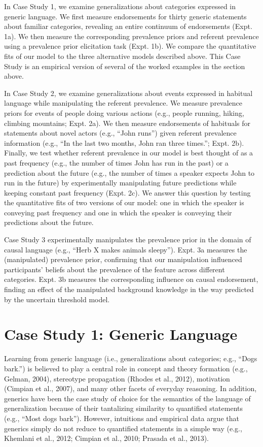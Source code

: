 \documentclass[english,,man,floatsintext]{apa6}
\theoremstyle{definition}
\theoremstyle{definition}
\theoremstyle{definition}
\theoremstyle{remark}
\begin{document}
In Case Study 1, we examine generalizations about categories expressed
in generic language. We first measure endorsements for thirty generic
statements about familiar categories, revealing an entire continuum of
endorsements (Expt. 1a). We then measure the corresponding prevalence
priors and referent prevalence using a prevalence prior elicitation task
(Expt. 1b). We compare the quantitative fits of our model to the three
alternative models described above. This Case Study is an empirical
version of several of the worked examples in the section above.

In Case Study 2, we examine generalizations about events expressed in
habitual language while manipulating the referent prevalence. We measure
prevalence priors for events of people doing various actions (e.g.,
people running, hiking, climbing mountains; Expt. 2a). We then measure
endorsements of habituals for statements about novel actors (e.g.,
\enquote{John runs}) given referent prevalence information (e.g.,
\enquote{In the last two months, John ran three times.}; Expt. 2b).
Finally, we test whether referent prevalence in our model is best
thought of as a past frequency (e.g., the number of times John has run
in the past) or a prediction about the future (e.g., the number of times
a speaker expects John to run in the future) by experimentally
manipulating future predictions while keeping constant past frequency
(Expt. 2c). We answer this question by testing the quantitative fits of
two versions of our model: one in which the speaker is conveying past
frequency and one in which the speaker is conveying their predictions
about the future.

Case Study 3 experimentally manipulates the prevalence prior in the
domain of causal language (e.g., \enquote{Herb X makes animals sleepy}).
Expt. 3a measures the (manipulated) prevalence prior, confirming that
our manipulation influenced participants' beliefs about the prevalence
of the feature across different categories. Expt. 3b measures the
corresponding influence on causal endorsement, finding an effect of the
manipulated background knowledge in the way predicted by the uncertain
threshold model.

\hypertarget{case-study-1-generic-language}{%
\section{Case Study 1: Generic
Language}\label{case-study-1-generic-language}}

Learning from generic language (i.e., generalizations about categories;
e.g., \enquote{Dogs bark.}) is believed to play a central role in
concept and theory formation (e.g., Gelman, 2004), stereotype
propagation (Rhodes et al., 2012), motivation (Cimpian et al., 2007),
and many other facets of everyday reasoning. In addition, generics have
been the case study of choice for the semantics of the language of
generalization because of their tantalizing similarity to quantified
statements (e.g., \enquote{Most dogs bark}). However, intuitions and
empirical data argue that generics simply do not reduce to quantified
statements in a simple way (e.g., Khemlani et al., 2012; Cimpian et al.,
2010; Prasada et al., 2013).
\end{document}
